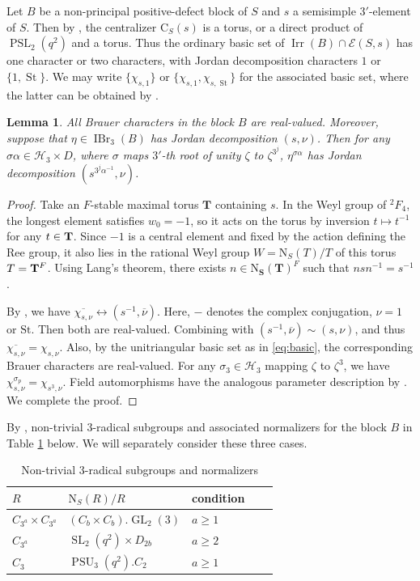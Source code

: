 \documentclass[11pt,a4paper]{article}
\numberwithin{equation}{section}
\newtheorem{lemma}[theorem]{Lemma}
\theoremstyle{definition}
\theoremstyle{remark}
\newcommand{\Irr}{\operatorname{Irr}}
\newcommand{\IBr}{\operatorname{IBr}}
\newcommand{\GL}{\operatorname{GL}}
\newcommand{\SL}{\operatorname{SL}}
\DeclareMathOperator{\PSL}{PSL}
\DeclareMathOperator{\PSU}{PSU}
\DeclareMathOperator{\St}{St}
\newcommand{\HH}{\mathcal H}
\newcommand{\NN}{\mathrm N}
\newcommand{\CC}{\mathrm C}
\begin{document}
Let $B$ be a non-principal positive-defect block of $S$ and
$s$ a semisimple $3'$-element of $S$. Then by \cite[Table 3]{Malle}, the centralizer $\CC_S(s)$ is a torus, or a direct product of $\PSL_2(q^2)$ and a torus. 
Thus the ordinary basic set of $\Irr(B)\cap \mathcal{E}(S,s)$ has one character or two characters, with Jordan decomposition  characters $1$ or $\{1,\St \}$. We may write $\{\chi_{s,1}\}$ or $\{\chi_{s,1},\chi_{s,\St}\}$ for the associated  basic set, where the latter can be obtained by \cite[Section 4 and Tables~D.2 and D.5]{Himstedt}.



\begin{lemma}\label{lem:3.19}
All Brauer characters in the block $B$ are real-valued. Moreover, suppose that $\eta\in\IBr_3(B)$ has Jordan decomposition $(s,\nu)$. Then for any $\sigma\alpha\in\HH_3\times D$, where $\sigma$ maps $3'$-th root of unity $\zeta$ to $\zeta^{3^j}$, 
$\eta^{\sigma\alpha}$ has Jordan decomposition $(s^{3^{j}\alpha^{-1}},\nu)$.
\end{lemma}
\begin{proof}
Take an $F$-stable maximal torus $\mathbf T$ containing $s$. In the Weyl group of ${}^2F_4$, the longest element satisfies
$w_0=-1$, so it acts on the torus by inversion
$t\mapsto t^{-1}$ for any $t\in {\bf T}$. Since $-1$ is a central element and fixed by the action defining the Ree group, it also lies in the rational Weyl group $W=\NN_S(T)/T$ of this torus $T={\bf T}^F$. Using Lang's theorem, there exists  $n\in \NN_{\mathbf S}(\mathbf T)^F$ such that $nsn^{-1}=s^{-1}$.

By \cite[Theorem B]{Johansson},
we have  $\overline{\chi_{s,\nu}} \longleftrightarrow
(s^{-1},\overline{\nu})$. Here, $-$ denotes the complex conjugation, $\nu=1$ or $\mathrm{St}$. Then both are real-valued. Combining with
$(s^{-1},\overline{\nu})\sim(s,\nu)$,
and thus $\overline{\chi_{s,\nu}}=\chi_{s,\nu}$.
Also,  by the unitriangular basic set as in \eqref{eq:basic}, the corresponding Brauer characters are real-valued. For any $\sigma_3\in \HH_3$ mapping $\zeta$ to $\zeta^{3}$, we have
$\chi_{s,\nu}^{\sigma_p}=\chi_{s^{3},\nu}$.
Field automorphisms have the analogous parameter
description by \cite[Theorem 4.1]{Malle}.
We complete the proof.
\end{proof}

By \cite[Tables 3-4]{Malle}, non-trivial $3$-radical subgroups and associated normalizers for the block $B$ in Table \ref{tab:4} below. We will separately consider these three cases.
\begin{table}[ht]
\centering
\caption{Non-trivial \(3\)-radical subgroups and normalizers}\label{tab:4}
\begin{tabular}{@{}lllrr@{}}
\toprule
$R$ & $\NN_S(R)/R$&condition \\
\midrule
$C_{3^a}\times C_{3^a}$ &$(C_b\times C_b).\GL_2(3)$& $a\geq 1$\\
$C_{3^a}$ & $\SL_2(q^2)\times D_{2b}$& $a\geq 2$\\
$C_3$ & $\PSU_3(q^2).C_2$&$a\geq 1$\\
\bottomrule
\end{tabular}
\end{table}
\end{document}
